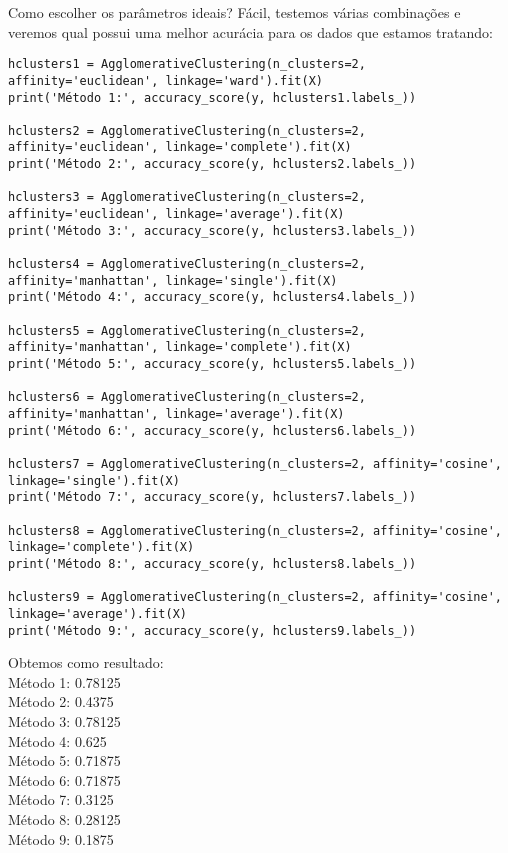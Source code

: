 Como escolher os parâmetros ideais? Fácil, testemos várias combinações e veremos qual possui uma melhor acurácia para os dados que estamos tratando:
\begin{lstlisting}[]
hclusters1 = AgglomerativeClustering(n_clusters=2, affinity='euclidean', linkage='ward').fit(X)
print('Método 1:', accuracy_score(y, hclusters1.labels_))

hclusters2 = AgglomerativeClustering(n_clusters=2, affinity='euclidean', linkage='complete').fit(X)
print('Método 2:', accuracy_score(y, hclusters2.labels_))

hclusters3 = AgglomerativeClustering(n_clusters=2, affinity='euclidean', linkage='average').fit(X)
print('Método 3:', accuracy_score(y, hclusters3.labels_))

hclusters4 = AgglomerativeClustering(n_clusters=2, affinity='manhattan', linkage='single').fit(X)
print('Método 4:', accuracy_score(y, hclusters4.labels_))

hclusters5 = AgglomerativeClustering(n_clusters=2, affinity='manhattan', linkage='complete').fit(X)
print('Método 5:', accuracy_score(y, hclusters5.labels_))

hclusters6 = AgglomerativeClustering(n_clusters=2, affinity='manhattan', linkage='average').fit(X)
print('Método 6:', accuracy_score(y, hclusters6.labels_))

hclusters7 = AgglomerativeClustering(n_clusters=2, affinity='cosine', linkage='single').fit(X)
print('Método 7:', accuracy_score(y, hclusters7.labels_))

hclusters8 = AgglomerativeClustering(n_clusters=2, affinity='cosine', linkage='complete').fit(X)
print('Método 8:', accuracy_score(y, hclusters8.labels_))

hclusters9 = AgglomerativeClustering(n_clusters=2, affinity='cosine', linkage='average').fit(X)
print('Método 9:', accuracy_score(y, hclusters9.labels_))
\end{lstlisting}

Obtemos como resultado: \\
{\ttfamily Método 1: 0.78125 \\
Método 2: 0.4375 \\
Método 3: 0.78125 \\
Método 4: 0.625 \\
Método 5: 0.71875 \\
Método 6: 0.71875 \\
Método 7: 0.3125 \\
Método 8: 0.28125 \\
Método 9: 0.1875}

